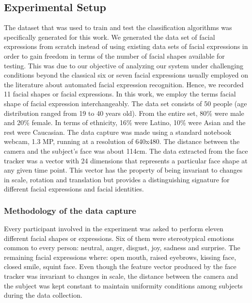 \documentclass[]{article}
\begin{document}
\subsection{Experimental Setup}
The dataset that was used to train and test the classification algorithms was specifically generated for this work. We
generated the data set of facial expressions from scratch instead of using existing data sets of facial expressions in
order to gain freedom in terms of the number of facial shapes available for testing. This was due to our objective of
analyzing our system under challenging conditions beyond the classical six or seven facial expressions usually employed
on the literature about automated facial expression  recognition. Hence, we recorded 11 facial shapes or facial
expressions. In this work, we employ the terms facial shape of facial expression interchangeably. The data set consists
of 50 people (age distribution ranged from 19 to 40 years old). From the entire set, 80\% were male and 20\% female. In
terms of ethnicity, 16\% were Latino, 10\% were Asian and the rest were Caucasian. The data capture was made using a
standard notebook webcam, 1.3 MP, running at a resolution of 640x480. The distance between the camera and the subject's
face was about 114cm. The data extracted from the face tracker was a vector with 24 dimensions that represents a
particular face shape at any given time point. This vector has the property of being invariant to changes in scale,
rotation and translation but provides a distinguishing signature for different facial expressions and facial identities.


\subsubsection{Methodology of the data capture}
Every participant involved in the experiment was asked to perform eleven different facial shapes or expressions.
Six of them were stereotypical emotions common to every person: neutral, anger, disgust, joy, sadness and surprise. The
remaining facial expressions where: open mouth, raised eyebrows, kissing face, closed smile, squint face.
Even though the feature vector produced  by the face tracker was invariant to changes in scale, the distance between the
camera and the subject was kept constant to maintain uniformity conditions among subjects during the data collection.
\end{document}
